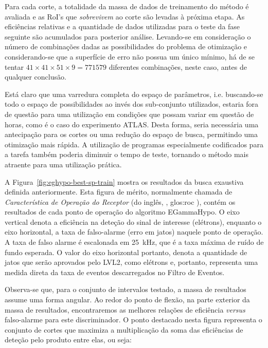 Para cada corte, a totalidade da massa de dados de treinamento do método é
avaliada e as RoI's que \textit{sobrevivem} ao corte são levadas à próxima
etapa. As eficiências relativas e a quantidade de dados utilizadas para o
teste da fase seguinte são acumulados para posterior análise. Levando-se em
consideração o número de combinações dadas as possibilidades do problema de
otimização e considerando-se que a superfície de erro não possua um único
mínimo, há de se tentar $41 \times 41 \times 51 \times 9 = 771579$ diferentes
combinações, neste caso, antes de qualquer conclusão.

Está claro que uma varredura completa do espaço de parâmetros,
i.e. buscando-se todo o espaço de possibilidades ao invés dos sub-conjunto
utilizados, estaria fora de questão para uma utilização em condições que
possam variar em questão de horas, como é o caso do experimento ATLAS. Desta
forma, seria necessária uma antecipação para os cortes ou uma redução do
espaço de busca, permitindo uma otimização mais rápida. A utilização de
programas especialmente codificados para a tarefa também poderia diminuir o
tempo de teste, tornando o método mais atraente para uma utilização prática.

A Figura~\ref{fig:eghypo-best-sp-train} mostra os resultados da busca
exaustiva definida anteriormente. Esta figura de mérito, normalmente chamada
de \textit{Característica de Operação do Receptor} (do inglês,
, \gls{glos:roc} \cite{vantrees}), contém os
resultados de cada ponto de operação do algoritmo EGammaHypo. O eixo vertical
denota a eficiência na deteção do sinal de interesse (elétrons), enquanto o
eixo horizontal, a taxa de falso-alarme (erro em jatos) naquele ponto de
operação. A taxa de falso alarme é escalonada em 25~kHz, que é a taxa máxima
de ruído de fundo esperada. O valor do eixo horizontal portanto, denota a
quantidade de jatos que serão aprovados pelo LVL2, como elétrons e, portanto,
representa uma medida direta da taxa de eventos descarregados no Filtro de
Eventos.

Observa-se que, para o conjunto de intervalos testado, a massa de resultados
assume uma forma angular. Ao redor do ponto de flexão, na parte exterior da
massa de resultados, encontraremos as melhores relações de eficiência
\textit{versus} falso-alarme para este discriminador. O ponto destacado nesta
figura representa o conjunto de cortes que maximiza a multiplicação da soma
das eficiências de deteção pelo produto entre elas, ou seja:

